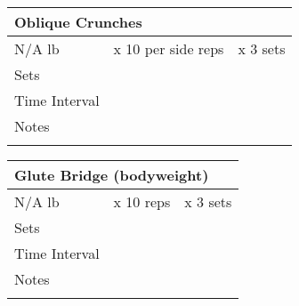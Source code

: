 \documentclass{article}
\begin{document}
\begin{center}
{\begin{tabularx}{\textwidth}{|X|X|X|}
        \hline
    \end{tabularx}}
\vspace{0.25cm}
{\setlength{\extrarowheight}{10pt}%
    \begin{tabularx}{\textwidth}{|X|X|X|}
        \hline
        \multicolumn{3}{|X|}{Oblique Crunches} \\
        \hline
        N/A lb & x 10 per side reps & x 3 sets \\
        \hline
        Sets & \multicolumn{2}{|X|}{ } \\
        \hline
        Time Interval & \multicolumn{2}{|X|}{ } \\
        \hline
        Notes & \multicolumn{2}{c|}{} \\
              & \multicolumn{2}{c|}{} \\
        \hline
    \end{tabularx}}
\vspace{0.25cm}
{\setlength{\extrarowheight}{10pt}%
    \begin{tabularx}{\textwidth}{|X|X|X|}
        \hline
        \multicolumn{3}{|X|}{Glute Bridge (bodyweight)} \\
        \hline
        N/A lb & x 10 reps & x 3 sets \\
        \hline
        Sets & \multicolumn{2}{|X|}{ } \\
        \hline
        Time Interval & \multicolumn{2}{|X|}{ } \\
        \hline
        Notes & \multicolumn{2}{c|}{} \\
              & \multicolumn{2}{c|}{} \\
        \hline
    \end{tabularx}}
\vspace{0.25cm}

\end{center}
\end{document}
